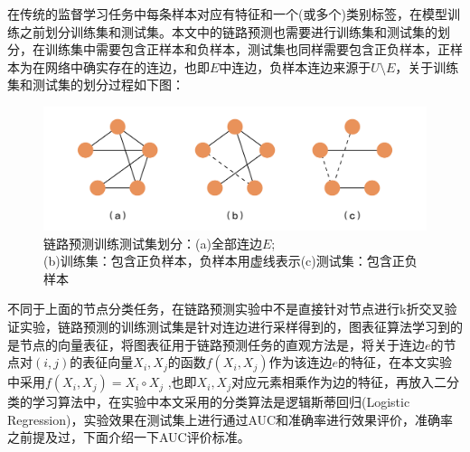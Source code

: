 在传统的监督学习任务中每条样本对应有特征和一个(或多个)类别标签，在模型训练之前划分训练集和测试集。本文中的链路预测也需要进行训练集和测试集的划分，在训练集中需要包含正样本和负样本，测试集也同样需要包含正负样本，正样本为在网络中确实存在的连边，也即$E$中连边，负样本连边来源于$U\setminus E$，关于训练集和测试集的划分过程如下图：
\begin{figure}
	\centering
	\includegraphics[width=6in]{figures/link_prediction_split}
	\caption{链路预测训练测试集划分：(a)全部连边$E$;\\(b)训练集：包含正负样本，负样本用虚线表示(c)测试集：包含正负样本}
\end{figure}

不同于上面的节点分类任务，在链路预测实验中不是直接针对节点进行k折交叉验证实验，链路预测的训练测试集是针对连边进行采样得到的，图表征算法学习到的是节点的向量表征，将图表征用于链路预测任务的直观方法是，将关于连边$e$的节点对$(i,j)$的表征向量$X_i,X_j$的函数$f(X_i, X_j)$作为该连边$e$的特征，在本文实验中采用$f(X_i, X_j) = X_i\circ X_j$ ,也即$X_i, X_j$对应元素相乘作为边的特征，再放入二分类的学习算法中，在实验中本文采用的分类算法是逻辑斯蒂回归(Logistic Regression)，实验效果在测试集上进行通过AUC和准确率进行效果评价，准确率之前提及过，下面介绍一下AUC评价标准。

